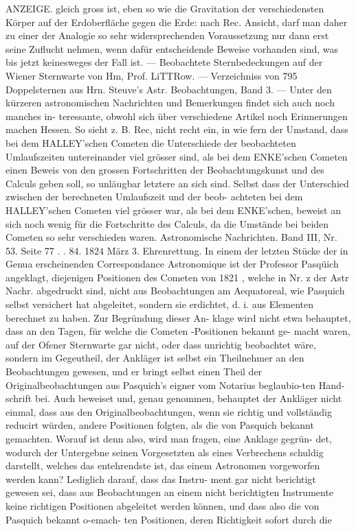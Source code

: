 \documentclass[12pt,a4paper]{article}
\begin{document}
{{{{{{{{ANZEIGE. gleich  gross  ist,  eben  so  wie  die  Gravitation  der  verschiedensten  Körper  auf  der  Erdoberfläche  gegen  die Erde:  nach  Rec.  Ansicht,  darf  man  daher  zu  einer  der  Analogie  so  sehr  widersprechenden  Voraussetzung nur  dann  erst  seine  Zuflucht  nehmen,  wenn  dafür  entscheidende  Beweise  vorhanden  sind,  was  bis  jetzt keinesweges  der  Fall  ist.  ---  Beobachtete  Sternbedeckungen  auf  der  Wiener  Sternwarte  von  Hm,  Prof. LiTTRow.  ---  Verzeichniss  von  795  Doppelsternen  aus  Hrn.  Steuve's  Astr.  Beobachtungen,  Band  3.  --- Unter  den  kürzeren  astronomischen  Nachrichten  und  Bemerkungen  findet  sich  auch  noch  manches  in- teressante, obwohl  sich  über  verschiedene  Artikel  noch  Erinnerungen  machen  Hessen.  So  sieht  z.  B. Rec,  nicht  recht  ein,  in  wie  fern  der  Umstand,  dass  bei  dem  HALLEY'schen  Cometen  die  Unterschiede der  beobachteten  Umlaufszeiten  untereinander  viel  grösser  sind,  als  bei  dem  ENKE'schen  Cometen  einen Beweis  von  den  grossen  Fortschritten  der  Beobachtungskunst  und  des  Calculs  geben  soll,  so  unläugbar letztere  an  sich  sind.  Selbst  dass  der  Unterschied  zwischen  der  berechneten  Umlaufszeit  und  der  beob- achteten bei  dem  HALLEY'schen  Cometen  viel  grösser  war,  als  bei  dem  ENKE'schen,  beweist  an  sich  noch wenig  für  die  Fortschritte  des  Calculs,  da  die  Umstände  bei  beiden  Cometen  so  sehr  verschieden  waren. Astronomische  Nachrichten.     Band  III,  Nr.  53.     Seite  77  . .  84.     1824  März  3. Ehrenrettung. In  einem  der  letzten  Stücke  der  in  Genua  erscheinenden  Correspondance  Astronomique  ist  der Professor  Pasqüich  angeklagt,  diejenigen  Positionen  des  Cometen  von  1821 ,  welche  in  Nr.  z  der  Astr Nachr.  abgedruckt  sind,  nicht  aus  Beobachtungen  am  Aequatoreal,  wie  Pasquich  selbst  versichert  hat abgeleitet,  sondern  sie  erdichtet,  d.  i.  aus  Elementen  berechnet  zu  haben.  Zur  Begründung  dieser  An- klage wird  nicht  etwa  behauptet,  dass  an  den  Tagen,  für  welche  die  Cometen -Positionen  bekannt  ge- macht waren,  auf  der  Ofener  Sternwarte  gar  nicht,  oder  dass  unrichtig  beobachtet  wäre,  sondern  im Gegeutheil,  der  Ankläger  ist  selbst  ein  Theilnehmer  an  den  Beobachtungen  gewesen,  und  er  bringt selbst  einen  Theil  der  Originalbeobachtungen  aus  Pasquich's  eigner  vom  Notarius  beglaubio-ten  Hand- schrift bei.  Auch  beweiset  und,  genau  genommen,  behauptet  der  Ankläger  nicht  einmal,  dass  aus  den Originalbeobachtungen,  wenn  sie  richtig  und  vollständig  reducirt  würden,  andere  Positionen  folgten,  als die  von  Pasquich  bekannt  gemachten.  Worauf  ist  denn  also,  wird  man  fragen,  eine  Anklage  gegrün- det, wodurch  der  Untergebne  seinen  Vorgesetzten  als  eines  Verbrechens  schuldig  darstellt,  welches  das entehrendste  ist,  das  einem  Astronomen  vorgeworfen  werden  kann?  Lediglich  darauf,  dass  das  Instru- ment gar  nicht  berichtigt  gewesen  sei,  dass  aus  Beobachtungen  an  einem  nicht  berichtigten  Instrumente keine  richtigen  Positionen  abgeleitet  werden  können,  und  dass  also  die  von  Pasquich  bekannt  o-emach- ten  Positionen,  deren  Richtigkeit  sofort  durch  die }}}}}}}}
\end{document}
